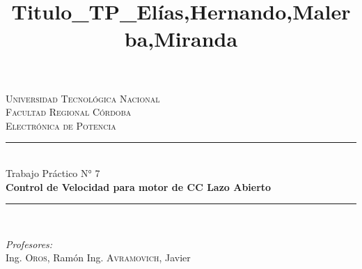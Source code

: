 \documentclass[11pt, a4paper]{article}
\title{Titulo_TP_Elías,Hernando,Malerba,Miranda}
\begin{document}
	
	\begin{titlepage}
		\newcommand{\HRule}{\rule{\linewidth}{0.5mm}} %
		
		\center %
		
		
		\textsc{\LARGE Universidad Tecnológica Nacional}\\[1cm] %
		\textsc{\LARGE Facultad Regional Córdoba}\\[1cm] %
		\textsc{\Large Electrónica de Potencia}\\[2.5cm] %
		
		
		\HRule \\[0.4cm]
		{\huge Trabajo Práctico N° 7 \\[0.5cm] \textbf{Control de Velocidad para motor de CC Lazo Abierto}}\\[0.4cm] %
		\HRule \\[1.0cm]
		
		
		\vfill
		
		\begin{minipage}{0.805\textwidth}
			\begin{flushleft} \large
				\emph{Profesores:}\\
				Ing. \textsc {Oros}, Ramón\newline %
				Ing. \textsc {Avramovich}, Javier\newline %
			\end{flushleft}
		\end{minipage}\\[0.5cm]
			

\end{titlepage}
\end{document}
